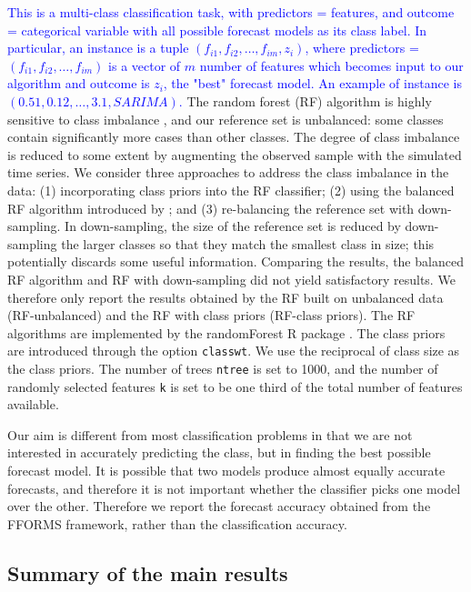 \documentclass[11pt,a4paper,]{article}
\begin{document}
\textcolor{blue}{This is a multi-class classification task, with predictors = features, and outcome = categorical variable with all possible forecast models as its class label. In particular, an instance is a tuple $(f_{i1}, f_{i2}, \dots, f_{im}, z_i)$, where predictors = $(f_{i1}, f_{i2}, \dots, f_{im})$ is a vector of $m$ number of features which becomes input to our algorithm and outcome is $z_i$, the "best" forecast model. An example of instance is $(0.51, 0.12, \dots, 3.1, SARIMA)$.}
The random forest (RF) algorithm is highly sensitive to class imbalance \autocite{breiman2001random}, and our reference set is unbalanced: some classes contain significantly more cases than other classes. The degree of class imbalance is reduced to some extent by augmenting the observed sample with the simulated time series. We consider three approaches to address the class imbalance in the data: (1) incorporating class priors into the RF classifier; (2) using the balanced RF algorithm introduced by \textcite{chen2004using}; and (3) re-balancing the reference set with down-sampling. In down-sampling, the size of the reference set is reduced by down-sampling the larger classes so that they match the smallest class in size; this potentially discards some useful information. Comparing the results, the balanced RF algorithm and RF with down-sampling did not yield satisfactory results. We therefore only report the results obtained by the RF built on unbalanced data (RF-unbalanced) and the RF with class priors (RF-class priors). The RF algorithms are implemented by the randomForest R package \autocites{liaw2002randomforest}{rfpkg}. The class priors are introduced through the option \texttt{classwt}. We use the reciprocal of class size as the class priors. The number of trees \texttt{ntree} is set to 1000, and the number of randomly selected features \texttt{k} is set to be one third of the total number of features available.

Our aim is different from most classification problems in that we are not interested in accurately predicting the class, but in finding the best possible forecast model. It is possible that two models produce almost equally accurate forecasts, and therefore it is not important whether the classifier picks one model over the other. Therefore we report the forecast accuracy obtained from the FFORMS framework, rather than the classification accuracy.

\hypertarget{sec:results}{%
\subsection{Summary of the main results}\label{sec:results}}
\end{document}
